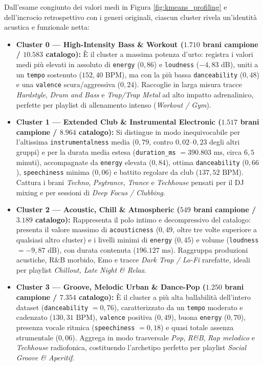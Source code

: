 \documentclass[12pt,a4paper]{article}
\begin{document}
Dall'esame congiunto dei valori medi in Figura \ref{fig:kmeans_profiling} e dell'incrocio retrospettivo con i generi originali, ciascun cluster rivela un'identità acustica e funzionale netta:
\begin{itemize}
    \item \textbf{Cluster 0 — High-Intensity Bass \& Workout ($1.710$ brani campione / $10.583$ catalogo):} È il cluster a massima potenza d'urto: registra i valori medi più elevati in assoluto di \texttt{energy} ($0,86$) e \texttt{loudness} ($-4,83\text{ dB}$), uniti a un \texttt{tempo} sostenuto ($152,40\text{ BPM}$), ma con la più bassa \texttt{danceability} ($0,48$) e una \texttt{valence} scura/aggressiva ($0,24$). Raccoglie in larga misura tracce \textit{Hardstyle}, \textit{Drum and Bass} e \textit{Trap/Trap Metal} ad alto impatto adrenalinico, perfette per playlist di allenamento intenso (\textit{Workout / Gym}).
    \item \textbf{Cluster 1 — Extended Club \& Instrumental Electronic ($1.517$ brani campione / $8.964$ catalogo):} Si distingue in modo inequivocabile per l'altissima \texttt{instrumentalness} media ($0,79$, contro $0,02\text{--}0,23$ degli altri gruppi) e per la durata media estesa (\texttt{duration\_ms} $= 390.803\text{ ms}$, circa $6,5$ minuti), accompagnate da \texttt{energy} elevata ($0,84$), ottima \texttt{danceability} ($0,66$), \texttt{speechiness} minima ($0,06$) e battito regolare da club ($137,52\text{ BPM}$). Cattura i brani \textit{Techno}, \textit{Psytrance}, \textit{Trance} e \textit{Techhouse} pensati per il DJ mixing e per sessioni di \textit{Deep Focus / Clubbing}.
    \item \textbf{Cluster 2 — Acoustic, Chill \& Atmospheric ($549$ brani campione / $3.189$ catalogo):} Rappresenta il polo intimo e decompressivo del catalogo: presenta il valore massimo di \texttt{acousticness} ($0,49$, oltre tre volte superiore a qualsiasi altro cluster) e i livelli minimi di \texttt{energy} ($0,45$) e volume (\texttt{loudness} $= -9,87\text{ dB}$), con durata contenuta ($196.127\text{ ms}$). Raggruppa produzioni acustiche, R\&B morbido, Emo e tracce \textit{Dark Trap / Lo-Fi} rarefatte, ideali per playlist \textit{Chillout, Late Night \& Relax}.
    \item \textbf{Cluster 3 — Groove, Melodic Urban \& Dance-Pop ($1.250$ brani campione / $7.354$ catalogo):} È il cluster a più alta ballabilità dell'intero dataset (\texttt{danceability} $= 0,76$), caratterizzato da un \texttt{tempo} moderato e cadenzato ($130,31\text{ BPM}$), \texttt{valence} positiva ($0,49$), buona \texttt{energy} ($0,70$), presenza vocale ritmica (\texttt{speechiness} $= 0,18$) e quasi totale assenza strumentale ($0,06$). Aggrega in modo trasversale \textit{Pop}, \textit{R\&B}, \textit{Rap melodico} e \textit{Techhouse} radiofonica, costituendo l'archetipo perfetto per playlist \textit{Social Groove \& Aperitif}.

\end{itemize}
\end{document}
